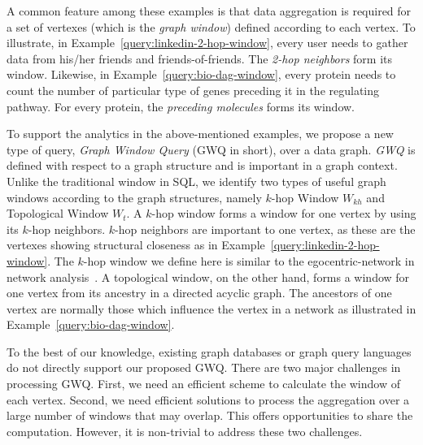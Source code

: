 A common feature among these examples is that data aggregation is required for a set of vertexes (which is the {\em graph window}) 
defined according to each vertex.  To illustrate, in Example~\ref{query:linkedin-2-hop-window}, every user needs to gather data from his/her friends and friends-of-friends. 
The \emph{2-hop neighbors} form its window. Likewise, in Example~\ref{query:bio-dag-window}, every protein needs to count the number of particular type of genes preceding it in the regulating pathway. For every protein, the
\emph{preceding molecules} forms its window. 

To support the analytics in the above-mentioned examples, we propose a new 
type of query, \emph{Graph Window Query} (GWQ in short),
over a data graph. \emph{GWQ} is defined with respect to a graph structure 
and is important in a graph context. Unlike the traditional window in SQL, 
we identify two types of useful graph windows according to the 
graph structures, namely $k$-hop Window $W_{kh}$ and Topological Window $W_t$. 
A $k$-hop window forms a window for one vertex by using its $k$-hop neighbors. 
$k$-hop neighbors are important to one vertex, as these are the vertexes 
showing structural closeness as in Example~\ref{query:linkedin-2-hop-window}. The $k$-hop window 
we define here is similar to the egocentric-network in network analysis~\cite{burt2009structural,mondal2014eagr}. 
A topological window, on the other hand, forms a window for one vertex from its ancestry in a directed acyclic graph. The ancestors of one vertex are normally those which influence the vertex in a network as illustrated in Example~\ref{query:bio-dag-window}. 

To the best of our knowledge, existing graph databases or graph query languages
do not directly support our proposed GWQ. There are two major challenges 
in processing GWQ. First, we need an efficient scheme to  
calculate the window of each vertex. Second, we need
efficient solutions to process the aggregation over a large number 
of windows that may overlap. This offers opportunities to share the 
computation. However, it is non-trivial to address these two challenges.  

